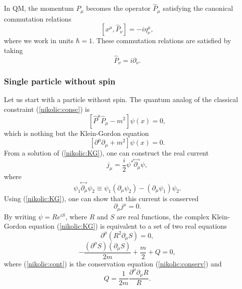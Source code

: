 \documentclass[12pt,twoside]{report} %
\begin{document}
In QM, the momentum $P_{\mu}$ becomes the operator $\hat{P}_{\mu}$
satisfying the canonical commutation relations
\begin{equation}\label{nikolic:e3}
[x^{\mu},\hat{P}_{\nu}]=-i\eta^{\mu}_{\nu} ,
\end{equation}
where we work in units $\hbar=1$. These commutation relations are satisfied
by taking
\begin{equation}\label{nikolic:e2}
\hat{P}_{\nu}=i\partial_{\nu} .
\end{equation}

\subsubsection{Single particle without spin}

Let us start with a particle without spin. 
The quantum analog of the classical constraint (\ref{nikolic:consc}) is
\begin{equation}\label{nikolic:consq}
 [\hat{P}^{\mu}\hat{P}_{\mu}-m^2]\psi(x) =0 ,
\end{equation}
which is nothing but the Klein-Gordon equation
\begin{equation}\label{nikolic:KG}
 [\partial^{\mu}\partial_{\mu}+m^2]\psi(x) =0 .
\end{equation}
From a solution of  (\ref{nikolic:KG}), one can construct the real current
\begin{equation}\label{nikolic:loc2}
j_{\mu}=\frac{i}{2}\psi^*  \!\stackrel{\leftrightarrow\;}{\partial_{\mu}}\!   \psi ,
\end{equation}
where 
\begin{equation}
\psi_1  \!\stackrel{\leftrightarrow\;}{\partial_{\mu}}\!   \psi_2
\equiv  \psi_1 (\partial_{\mu}\psi_2) -  (\partial_{\mu}\psi_1) \psi_2 .
\end{equation}
Using (\ref{nikolic:KG}), one can show that this current is conserved
\begin{equation}\label{nikolic:conserv}
\partial_{\mu}j^{\mu}=0.
\end{equation}
By writing $\psi=Re^{iS}$, where $R$ and $S$ are real functions,
the complex Klein-Gordon equation (\ref{nikolic:KG}) is equivalent to a set of
two real equations
\begin{equation}\label{nikolic:cont}
\partial^{\mu}(R^2\partial_{\mu}S)=0,
\end{equation}
\begin{equation}\label{nikolic:HJ}
-\frac{(\partial^{\mu}S)(\partial_{\mu}S)}{2m} +\frac{m}{2} +Q=0,
\end{equation}
where (\ref{nikolic:cont}) is the conservation equation
(\ref{nikolic:conserv})  and
\begin{equation}\label{nikolic:Q=}
Q=\frac{1}{2m}\frac{\partial^{\mu}\partial_{\mu}R}{R} .
\end{equation}
\end{document}
